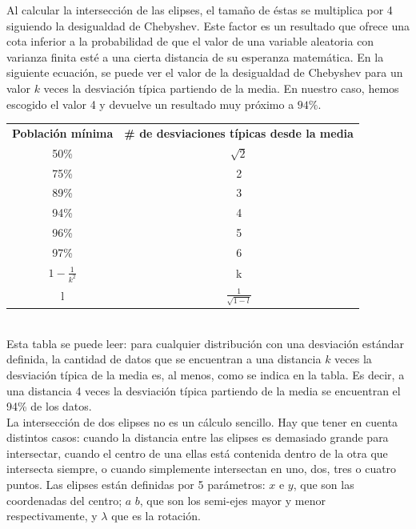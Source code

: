 Al calcular la intersección de las elipses, el tamaño de éstas se multiplica por 4 siguiendo la desigualdad de Chebyshev. Este factor es un resultado que ofrece una cota inferior a la probabilidad de que el valor de una variable aleatoria con varianza finita esté a una cierta distancia de su esperanza matemática. En la siguiente ecuación, se puede ver el valor de la desigualdad de Chebyshev para un valor $k$ veces la desviación típica partiendo de la media. En nuestro caso, hemos escogido el valor 4 y devuelve un resultado muy próximo a $94\%$. \\

\begin{tabular}{cc}
  \textbf{Población mínima} & \textbf{\# de desviaciones típicas desde la media} \\
  50\% & $\sqrt{2}$ \\
  75\% & 2 \\ 
  89\% & 3 \\
  94\% & 4 \\
  96\% & 5 \\
  97\% & 6 \\
  $1-\frac{1}{k^2}$ & k \\
  l & $\frac{1}{\sqrt{1-l}}$
\end{tabular}
\\

Esta tabla se puede leer: para cualquier distribución con una desviación estándar definida, la cantidad de datos que se encuentran a una distancia $k$ veces la desviación típica de la media es, al menos, como se indica en la tabla. Es decir, a una distancia 4 veces la desviación típica partiendo de la media se encuentran el 94\% de los datos. \\

La intersección de dos elipses no es un cálculo sencillo. Hay que tener en cuenta distintos casos: cuando la distancia entre las elipses es demasiado grande para intersectar, cuando el centro de una ellas está contenida dentro de la otra que intersecta siempre, o cuando simplemente intersectan en uno, dos, tres o cuatro puntos. Las elipses están definidas por 5 parámetros: $x$ e $y$, que son las coordenadas del centro; $a$  $b$, que son los semi-ejes mayor y menor respectivamente, y $\lambda$ que es la rotación. \\

